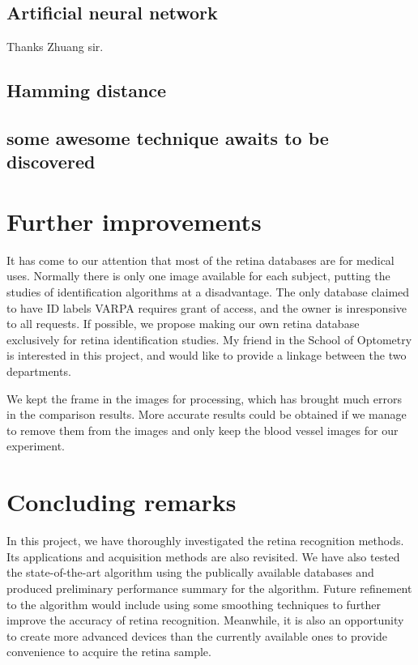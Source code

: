 \documentclass[a4paper,11pt]{article}
\theoremstyle{plain} %
\begin{document}
\subsection{Artificial neural network}
Thanks Zhuang sir.
\subsection{Hamming distance}

\subsection{some awesome technique awaits to be discovered}



\section{Further improvements}
It has come to our attention that most of the retina databases are for medical uses. Normally there is only one image available for each subject, putting the studies of identification algorithms at a disadvantage. The only database claimed to have ID labels VARPA requires grant of access, and the owner is inresponsive to all requests. If possible, we propose making our own retina database exclusively for retina identification studies. My friend in the School of Optometry is interested in this project, and would like to provide a linkage between the two departments.

We kept the frame in the images for processing, which has brought much errors in the comparison results. More accurate results could be obtained if we manage to remove them from the images and only keep the blood vessel images for our experiment.



\section{Concluding remarks}
In this project, we have thoroughly investigated the retina recognition methods. Its applications and acquisition methods are also revisited. We have also tested the state-of-the-art algorithm using the publically available databases and produced preliminary performance summary for the algorithm. Future refinement to the algorithm would include using some smoothing techniques  to further improve the accuracy of retina recognition. Meanwhile, it is also an opportunity to create more advanced devices than the currently available ones to provide convenience to acquire the retina sample.




\end{document}
